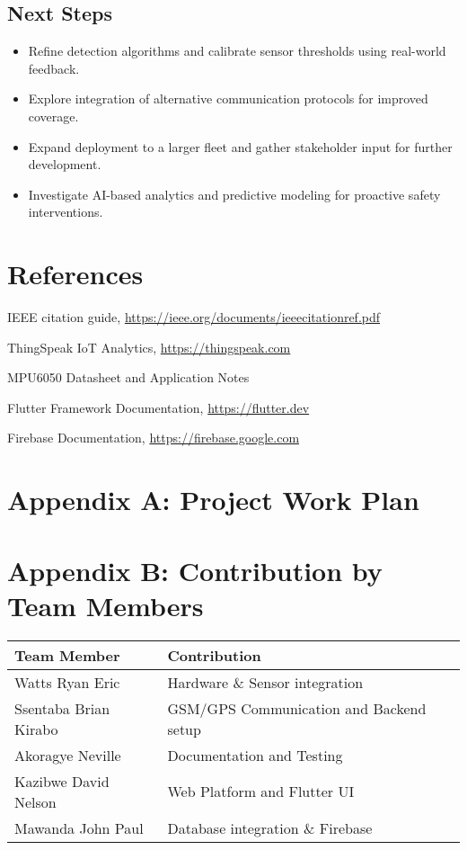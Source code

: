 \documentclass[12pt]{article}
\begin{document}
\subsection{Next Steps}
\begin{itemize}
  \item Refine detection algorithms and calibrate sensor thresholds using real-world feedback.
  \item Explore integration of alternative communication protocols for improved coverage.
  \item Expand deployment to a larger fleet and gather stakeholder input for further development.
  \item Investigate AI-based analytics and predictive modeling for proactive safety interventions.
\end{itemize}

\section*{References}
\begin{thebibliography}{9}

 IEEE citation guide, \url{https://ieee.org/documents/ieeecitationref.pdf}

 ThingSpeak IoT Analytics, \url{https://thingspeak.com}

 MPU6050 Datasheet and Application Notes

 Flutter Framework Documentation, \url{https://flutter.dev}

 Firebase Documentation, \url{https://firebase.google.com}

\end{thebibliography}

\section*{Appendix A: Project Work Plan}

\section*{Appendix B: Contribution by Team Members}
\begin{longtable}{@{}ll@{}}
\toprule
\textbf{Team Member} & \textbf{Contribution} \\
\midrule
Watts Ryan Eric & Hardware \& Sensor integration \\
Ssentaba Brian Kirabo & GSM/GPS Communication and Backend setup \\
Akoragye Neville & Documentation and Testing \\
Kazibwe David Nelson & Web Platform and Flutter UI \\
Mawanda John Paul & Database integration \& Firebase \\
\bottomrule
\end{longtable}
\end{document}
